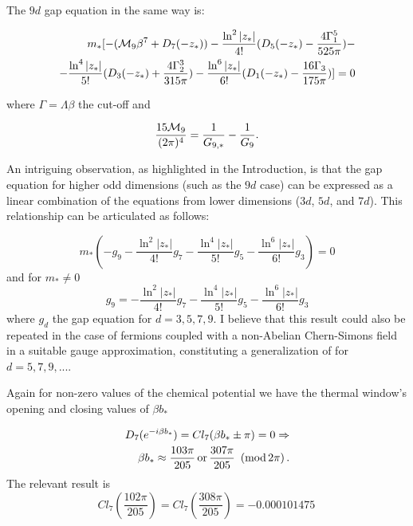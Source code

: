 \documentclass[twoside]{article}
\begin{document}
The $9d$ gap equation in the same way is:

\begin{align}
m_*[-({\cal M}_9\beta^7+D_7(-z_*))-\frac{\ln^2|z_*|}{4!}(D_5(-z_*)-\frac{4\Gamma_1^5}{525\pi})-\\
-\frac{\ln^4|z_*|}{5!}(D_3(-z_*)+\frac{4\Gamma_2^3}{315\pi})-\frac{\ln^6|z_*|}{6!}(D_1(-z_*)-\frac{16\Gamma_3}{175\pi})]=0
\end{align}

where $\Gamma=\Lambda\beta$ the cut-off and

\begin{equation}
\frac{15{\cal M}_9}{(2\pi)^4}=\frac{1}{G_{9,*}}-\frac{1}{G_9}.
\end{equation}

An intriguing observation, as highlighted in the Introduction, is that the gap equation for higher odd dimensions (such as the $9d$ case) can be expressed as a linear combination of the equations from lower dimensions ($3d$, $5d$, and $7d$). This relationship can be articulated as follows:

\begin{equation}
m_*(-g_9-\frac{\ln^2|z_*|}{4!}g_7
-\frac{\ln^4|z_*|}{5!}g_5-\frac{\ln^6|z_*|}{6!}g_3)=0
\end{equation}
and for $m_*\not=0$
\begin{equation}
\label{gaplinear9}
g_9=-\frac{\ln^2|z_*|}{4!}g_7
-\frac{\ln^4|z_*|}{5!}g_5-\frac{\ln^6|z_*|}{6!}g_3
\end{equation}
where $g_d$ the gap equation for $d=3,5,7,9$. I believe that this result could also be repeated in the case of fermions coupled with a non-Abelian Chern-Simons field in a suitable gauge approximation, constituting a generalization of \cite{Aharony:2012ns} for $d=5,7,9,...$.


Again for non-zero values of the chemical potential we have the thermal window's opening and closing values of $\beta b_*$

\begin{align}
\nonumber D_7(e^{-i\beta b_*})=Cl_7(\beta b_*\pm \pi)=0\Rightarrow \\
 \beta b_*\approx \frac{103\pi}{205}\,{\rm or}\,\frac{307\pi}{205} \,\,\,({\rm mod}\,2\pi)\,.
\end{align}
The relevant result is 
\begin{equation}
Cl_7\left(\frac{102\pi}{205}\right)=Cl_7\left(\frac{308\pi}{205}\right)=-0.000101475\,
\end{equation}
\end{document}
